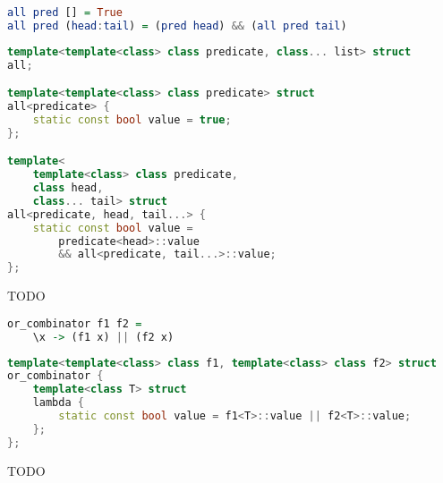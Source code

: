 \documentclass{article}
\begin{document}
\begin{center}
\begin{comment}
Higher-Order Functions Operating on Lists
Once you combine higher-order functions with lists you have a powerful functional language at your disposal. Higher-order functions operating on lists look very much like algorithms. Let me show you some classic examples. Here’s the function (or algorithm), all, that returns true if and only if all elements of a list satisfy a given predicate.
\end{comment}
\begin{lstlisting}[language=Haskell]
all pred [] = True
all pred (head:tail) = (pred head) && (all pred tail)
\end{lstlisting}
\Bigg\Downarrow
\begin{lstlisting}[language=C++]
template<template<class> class predicate, class... list> struct
all;

template<template<class> class predicate> struct
all<predicate> {
    static const bool value = true;
};

template<
    template<class> class predicate, 
    class head, 
    class... tail> struct
all<predicate, head, tail...> {
    static const bool value = 
        predicate<head>::value 
        && all<predicate, tail...>::value;
};
\end{lstlisting}
\end{center}
TODO
\begin{center}
\begin{comment}
Let’s start with a Haskell example. I want to define a function that takes two predicate functions and returns another predicate function that combines the two using logical OR. Here it is in Haskell: <lenti Haskell kód>. The or_combinator returns an anonymous function (the famous “lambda”) that takes one argument, x, calls both f1 and f2 with it, and returns the logical OR of the two results. The return value of or_combinator is this freshly constructed function. I can then call this function with an arbitrary argument. For instance, here I’m checking if 2 is either zero or one (guess what, it isn’t!):
(or_combinator is_zero is_one) 2
\end{comment}
\begin{lstlisting}[language=Haskell]
or_combinator f1 f2 = 
    \x -> (f1 x) || (f2 x)
\end{lstlisting}
\Bigg\Downarrow
\begin{lstlisting}[language=C++]
template<template<class> class f1, template<class> class f2> struct
or_combinator {
    template<class T> struct
    lambda {
        static const bool value = f1<T>::value || f2<T>::value;
    };
};
\end{lstlisting}
\end{center}
TODO
\end{document}
